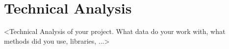 \section{Technical Analysis}
\label{sec:tech}
<Technical Analysis of your project. What data do your work with, what methods did you use, libraries, ...>